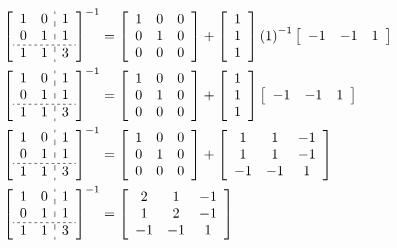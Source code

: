 \documentclass[12pt,a4paper]{paper}
\begin{document}
\begin{enumerate}
\begin{enumerate}
\begin{align*}
\left[\begin{array}{cc:c}1&0&1\\0&1&1\\\hdashline[2pt/2pt]1&1&3\end{array}\right]^{-1} &= \left[\begin{array}{ccc}1&0&0\\0&1&0\\0&0&0\end{array}\right] + \left[\begin{array}{c}1\\1\\1\end{array}\right]\left(1\right)^{-1}\left[\begin{array}{ccc}-1&-1&1\end{array}\right]\\
%
\left[\begin{array}{cc:c}1&0&1\\0&1&1\\\hdashline[2pt/2pt]1&1&3\end{array}\right]^{-1} &= \left[\begin{array}{ccc}1&0&0\\0&1&0\\0&0&0\end{array}\right] + \left[\begin{array}{c}1\\1\\1\end{array}\right]\left[\begin{array}{ccc}-1&-1&1\end{array}\right]\\
%
\left[\begin{array}{cc:c}1&0&1\\0&1&1\\\hdashline[2pt/2pt]1&1&3\end{array}\right]^{-1} &= \left[\begin{array}{ccc}1&0&0\\0&1&0\\0&0&0\end{array}\right] + \left[\begin{array}{ccc}1&1&-1\\1&1&-1\\-1&-1&1\end{array}\right]\\
%
\left[\begin{array}{cc:c}1&0&1\\0&1&1\\\hdashline[2pt/2pt]1&1&3\end{array}\right]^{-1} &= \left[\begin{array}{ccc}2&1&-1\\1&2&-1\\-1&-1&1\end{array}\right]

\end{align*}
\end{enumerate}
\end{enumerate}
\end{document}
